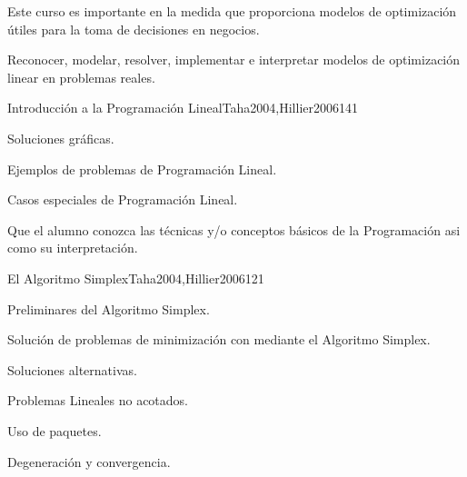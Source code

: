 \begin{syllabus}


\begin{justification}
Este curso es importante en la medida que proporciona modelos de optimización útiles para la toma de decisiones en negocios.
\end{justification}

\begin{goals}
\item Reconocer, modelar, resolver, implementar e interpretar modelos de optimización linear en problemas reales.
\end{goals}

\begin{outcomes}
\end{outcomes}

\begin{unit}{Introducción a la Programación Lineal}{Taha2004,Hillier2006}{14}{1}
   \begin{topics}
      \item Soluciones gráficas.
      \item Ejemplos de problemas de Programación Lineal.
      \item Casos especiales de Programación Lineal.
   \end{topics}

   \begin{unitgoals}
      \item Que el alumno conozca las técnicas y/o conceptos básicos de la Programación asi como su interpretación.
   \end{unitgoals}
\end{unit}

\begin{unit}{El Algoritmo Simplex}{Taha2004,Hillier2006}{12}{1}
   \begin{topics}
      \item Preliminares del Algoritmo Simplex.
      \item Solución de problemas de minimización con mediante el Algoritmo Simplex.
      \item Soluciones alternativas.
      \item Problemas Lineales no acotados.
      \item Uso de paquetes.
      \item Degeneración y convergencia.
   \end{topics}


\end{unit}
\end{syllabus}
